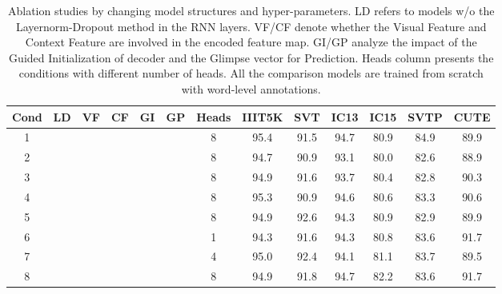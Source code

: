 \documentclass[runningheads]{llncs}
\begin{document}
\begin{table}[]
\vspace{-0.3cm} 
\caption{Ablation studies by changing model structures and hyper-parameters.  LD refers to models w/o the Layernorm-Dropout method in the RNN layers. VF/CF denote whether the Visual Feature and Context Feature are involved in the encoded feature map. GI/GP analyze the impact of the Guided Initialization of decoder and the Glimpse vector for Prediction. Heads column presents the conditions with different number of heads. All the comparison models are trained from scratch with word-level annotations.}
\label{tab3}
\centering
\begin{tabular}{|c|c|c|c|c|c|c|c|c|c|c|c|c|}
\hline
\textbf{Cond} & \textbf{LD} & \textbf{VF} & \textbf{CF} & \textbf{GI} & \textbf{GP} & \textbf{Heads} & \textbf{IIIT5K} & \textbf{SVT} & \textbf{IC13} & \textbf{IC15} & \textbf{SVTP} & \textbf{CUTE} \\ \hline
1             &                 &     &        &            &           & 8              & 95.4            & 91.5         & 94.7          & 80.9          & 84.9          & 89.9          \\
2             &         &       &    &         &           & 8              & 94.7            & 90.9         & 93.1        & 80.0            & 82.6          & 88.9          \\
3             &         &        &     &        &           & 8              & 94.9            & 91.6         & 93.7          & 80.4          & 82.8          & 90.3          \\
4       &         &         &      &       &           & 8              & 95.3            & 90.9         & 94.6          & 80.6          & 83.3          & 90.6          \\
5             &         &         &      &       &           & 8              & 94.9            & 92.6         & 94.3          & 80.9          & 82.9          & 89.9          \\
6             &       &        &     &        &           & 1              &94.3                 &91.6              & 94.3              &  80.8             & 83.6              & 91.7              \\
7     &       &    &      &       &           & 4              & 95.0              & 92.4         & 94.1          & 81.1          & 83.7          & 89.5          \\  \hline
8    &       &       &   &    &           & 8             & 94.9            & 91.8       & 94.7          & 82.2         & 83.6         & 91.7        \\ \hline
\end{tabular}
\end{table}
\vspace{-0.5cm}
\end{document}
